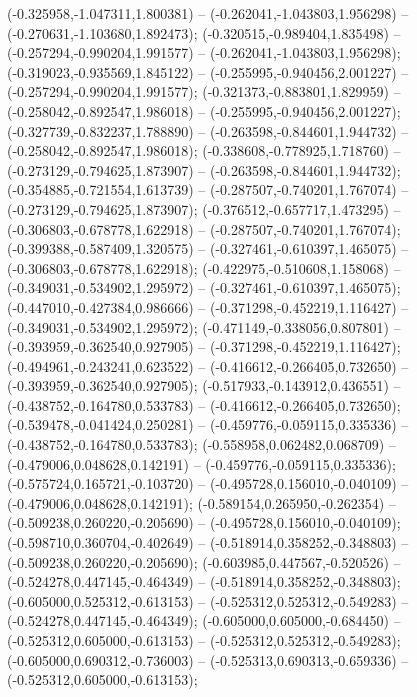 (-0.325958,-1.047311,1.800381) -- (-0.262041,-1.043803,1.956298) -- (-0.270631,-1.103680,1.892473);
 (-0.320515,-0.989404,1.835498) -- (-0.257294,-0.990204,1.991577) -- (-0.262041,-1.043803,1.956298);
 (-0.319023,-0.935569,1.845122) -- (-0.255995,-0.940456,2.001227) -- (-0.257294,-0.990204,1.991577);
 (-0.321373,-0.883801,1.829959) -- (-0.258042,-0.892547,1.986018) -- (-0.255995,-0.940456,2.001227);
 (-0.327739,-0.832237,1.788890) -- (-0.263598,-0.844601,1.944732) -- (-0.258042,-0.892547,1.986018);
 (-0.338608,-0.778925,1.718760) -- (-0.273129,-0.794625,1.873907) -- (-0.263598,-0.844601,1.944732);
 (-0.354885,-0.721554,1.613739) -- (-0.287507,-0.740201,1.767074) -- (-0.273129,-0.794625,1.873907);
 (-0.376512,-0.657717,1.473295) -- (-0.306803,-0.678778,1.622918) -- (-0.287507,-0.740201,1.767074);
 (-0.399388,-0.587409,1.320575) -- (-0.327461,-0.610397,1.465075) -- (-0.306803,-0.678778,1.622918);
 (-0.422975,-0.510608,1.158068) -- (-0.349031,-0.534902,1.295972) -- (-0.327461,-0.610397,1.465075);
 (-0.447010,-0.427384,0.986666) -- (-0.371298,-0.452219,1.116427) -- (-0.349031,-0.534902,1.295972);
 (-0.471149,-0.338056,0.807801) -- (-0.393959,-0.362540,0.927905) -- (-0.371298,-0.452219,1.116427);
 (-0.494961,-0.243241,0.623522) -- (-0.416612,-0.266405,0.732650) -- (-0.393959,-0.362540,0.927905);
 (-0.517933,-0.143912,0.436551) -- (-0.438752,-0.164780,0.533783) -- (-0.416612,-0.266405,0.732650);
 (-0.539478,-0.041424,0.250281) -- (-0.459776,-0.059115,0.335336) -- (-0.438752,-0.164780,0.533783);
 (-0.558958,0.062482,0.068709) -- (-0.479006,0.048628,0.142191) -- (-0.459776,-0.059115,0.335336);
 (-0.575724,0.165721,-0.103720) -- (-0.495728,0.156010,-0.040109) -- (-0.479006,0.048628,0.142191);
 (-0.589154,0.265950,-0.262354) -- (-0.509238,0.260220,-0.205690) -- (-0.495728,0.156010,-0.040109);
 (-0.598710,0.360704,-0.402649) -- (-0.518914,0.358252,-0.348803) -- (-0.509238,0.260220,-0.205690);
 (-0.603985,0.447567,-0.520526) -- (-0.524278,0.447145,-0.464349) -- (-0.518914,0.358252,-0.348803);
 (-0.605000,0.525312,-0.613153) -- (-0.525312,0.525312,-0.549283) -- (-0.524278,0.447145,-0.464349);
 (-0.605000,0.605000,-0.684450) -- (-0.525312,0.605000,-0.613153) -- (-0.525312,0.525312,-0.549283);
 (-0.605000,0.690312,-0.736003) -- (-0.525313,0.690313,-0.659336) -- (-0.525312,0.605000,-0.613153);
